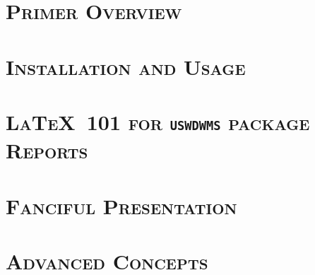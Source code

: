\def \uswdwmspkg{\texttt{uswdwms} package}

\pagebreak
\part{\textsc{Primer Overview}}

\pagebreak
\part{\textsc{Installation and Usage}}

\pagebreak
\part{\textsc{\LaTeX\ 101 for \uswdwmspkg{} Reports}}

\pagebreak
\part{\textsc{Fanciful Presentation}}

\pagebreak
\part{\textsc{Advanced Concepts}}

\pagebreak

